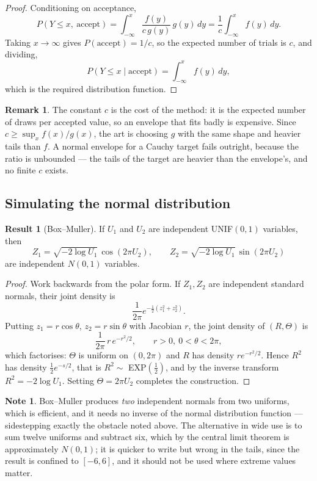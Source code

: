 \documentclass[11pt,a4paper]{article}
\theoremstyle{definition}
\newtheorem{result}[thm]{Result}
\newtheorem*{note}{Note}
\newtheorem*{remark}{Remark}
\begin{document}
\begin{proof}
Conditioning on acceptance,
$$P\left(Y\leq x,\ \text{accept}\right)
= \int_{-\infty}^{x} \frac{f(y)}{c\,g(y)}\,g(y)\,dy
= \frac{1}{c}\int_{-\infty}^{x} f(y)\,dy .$$
Taking $x\rightarrow\infty$ gives $P(\text{accept}) = 1/c$, so the expected
number of trials is $c$, and dividing,
$$P\left(Y\leq x \mid \text{accept}\right) = \int_{-\infty}^{x}f(y)\,dy ,$$
which is the required distribution function.
\end{proof}

\begin{remark}
The constant $c$ is the cost of the method: it is the expected number of draws
per accepted value, so an envelope that fits badly is expensive. Since
$c \geq \sup_x f(x)/g(x)$, the art is choosing $g$ with the same shape and
heavier tails than $f$. A normal envelope for a Cauchy target fails outright,
because the ratio is unbounded --- the tails of the target are heavier than the
envelope's, and no finite $c$ exists.
\end{remark}

\subsection{Simulating the normal distribution}

\begin{result}[Box--Muller]
If $U_1$ and $U_2$ are independent UNIF$(0,1)$ variables, then
$$Z_1 = \sqrt{-2\log U_1}\,\cos\left(2\pi U_2\right),\qquad
Z_2 = \sqrt{-2\log U_1}\,\sin\left(2\pi U_2\right)$$
are independent $N(0,1)$ variables.
\end{result}

\begin{proof}
Work backwards from the polar form. If $Z_1,Z_2$ are independent standard
normals, their joint density is
$$\frac{1}{2\pi}e^{-\frac12\left(z_1^{2}+z_2^{2}\right)} .$$
Putting $z_1 = r\cos\theta$, $z_2 = r\sin\theta$ with Jacobian $r$, the joint
density of $(R,\Theta)$ is
$$\frac{1}{2\pi}\,r\,e^{-r^{2}/2},\qquad r>0,\ 0<\theta<2\pi ,$$
which factorises: $\Theta$ is uniform on $(0,2\pi)$ and $R$ has density
$re^{-r^{2}/2}$. Hence $R^{2}$ has density $\tfrac12e^{-s/2}$, that is
$R^{2}\sim$ EXP$\left(\tfrac12\right)$, and by the inverse transform
$R^{2} = -2\log U_1$. Setting $\Theta = 2\pi U_2$ completes the construction.
\end{proof}

\begin{note}
Box--Muller produces \emph{two} independent normals from two uniforms, which is
efficient, and it needs no inverse of the normal distribution function ---
sidestepping exactly the obstacle noted above. The alternative in wide use is to
sum twelve uniforms and subtract six, which by the central limit theorem is
approximately $N(0,1)$; it is quicker to write but wrong in the tails, since the
result is confined to $[-6,6]$, and it should not be used where extreme values
matter.
\end{note}
\end{document}

